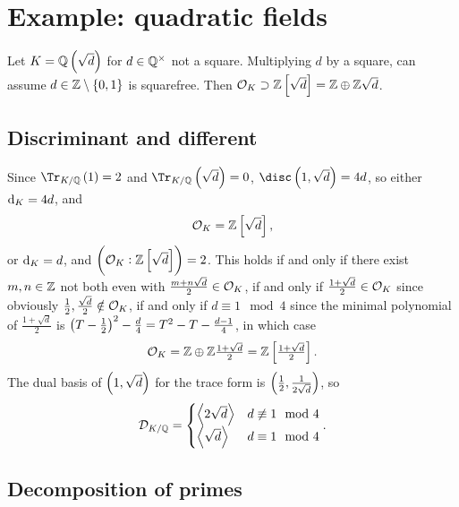 \pagebreak

\section{Example: quadratic fields}


Let $ K = \QQ\br{\sqrt{d}} $ for $ d \in \mathbb{Q}^\times $ not a square. Multiplying $ d $ by a square, can assume $ d \in \ZZ \setminus \cbr{0, 1} $ is squarefree. Then $ \OOO_K \supset \ZZ\sbr{\sqrt{d}} = \ZZ \oplus \ZZ\sqrt{d} $.

\subsection{Discriminant and different}

Since $ \Tr_{K / \QQ}\br{1} = 2 $ and $ \Tr_{K / \QQ}\br{\sqrt{d}} = 0 $, $ \disc \br{1, \sqrt{d}} = 4d $, so either $ \mathrm{d}_K = 4d $, and
$$ \OOO_K = \ZZ\sbr{\sqrt{d}}, $$
or $ \mathrm{d}_K = d $, and $ \br{\OOO_K : \ZZ\sbr{\sqrt{d}}} = 2 $. This holds if and only if there exist $ m, n \in \mathbb{Z} $ not both even with $ \tfrac{m + n\sqrt{d}}{2} \in \mathcal{O}_K $, if and only if $ \tfrac{1 + \sqrt{d}}{2} \in \mathcal{O}_K $ since obviously $ \tfrac{1}{2}, \tfrac{\sqrt{d}}{2} \notin \mathcal{O}_K $, if and only if $ d \equiv 1 \mod 4 $ since the minimal polynomial of $ \tfrac{1 + \sqrt{d}}{2} $ is $ \br{T - \tfrac{1}{2}}^2 - \tfrac{d}{4} = T^2 - T - \tfrac{d - 1}{4} $, in which case
$$ \OOO_K = \ZZ \oplus \ZZ\tfrac{1 + \sqrt{d}}{2} = \ZZ\sbr{\tfrac{1 + \sqrt{d}}{2}}. $$
The dual basis of $ \br{1, \sqrt{d}} $ for the trace form is $ \br{\tfrac{1}{2}, \tfrac{1}{2\sqrt{d}}} $, so
$$ \mathcal{D}_{K / \mathbb{Q}} =
\begin{cases}
\left\langle 2\sqrt{d} \right\rangle & d \not\equiv 1 \mod 4 \\
\left\langle \sqrt{d} \right\rangle & d \equiv 1 \mod 4
\end{cases}.
$$

\subsection{Decomposition of primes}

